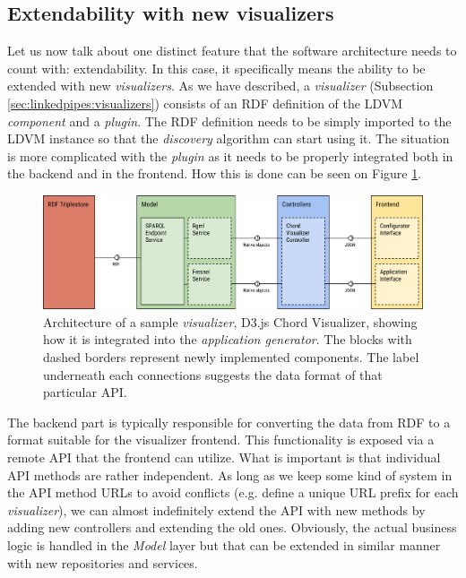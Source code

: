 \subsection{Extendability with new visualizers}
\label{sec:system-proposal:architecture-analysis:extendability}

Let us now talk about one distinct feature that the software architecture needs to count with: extendability. In this case, it specifically means the ability to be extended with new \emph{visualizers}. As we have described, a \emph{visualizer} (Subsection \ref{sec:linkedpipes:visualizers}) consists of an RDF definition of the LDVM \emph{component} and a \emph{plugin}. The RDF definition needs to be simply imported to the LDVM instance so that the \emph{discovery} algorithm can start using it. The situation is more complicated with the \emph{plugin} as it needs to be properly integrated both in the backend and in the frontend. How this is done can be seen on Figure \ref{fig:sample-visualizer-structure}.

\begin{figure}
	\centering
	\includegraphics[width=140mm]{img/04_chord_visualizer_structure.png}
	\caption{Architecture of a sample \emph{visualizer}, D3.js Chord Visualizer, showing how it is integrated into the \emph{application generator}. The blocks with dashed borders represent newly implemented components. The label underneath each connections suggests the data format of that particular API.} 
	\label{fig:sample-visualizer-structure}
\end{figure}

The backend part is typically responsible for converting the data from RDF to a format suitable for the visualizer frontend. This functionality is exposed via a remote API that the frontend can utilize. What is important is that individual API methods are rather independent. As long as we keep some kind of system in the API method URLs to avoid conflicts (e.g. define a unique URL prefix for each \emph{visualizer}), we can almost indefinitely extend the API with new methods by adding new controllers and extending the old ones. Obviously, the actual business logic is handled in the \emph{Model} layer but that can be extended in similar manner with new repositories and services.

